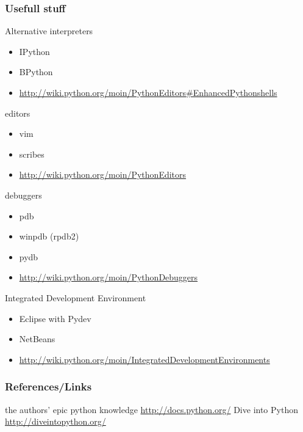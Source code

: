 \documentclass{beamer}
\begin{document}
\begin{frame}[allowframebreaks]
	\frametitle{Usefull stuff}
	
	\begin{block}{Alternative interpreters}
	\begin{itemize}
		\item IPython
		\item BPython
		\item \url{http://wiki.python.org/moin/PythonEditors\#EnhancedPythonshells}
	\end{itemize}
	\end{block}

	\begin{block}{editors}
	\begin{itemize}
		\item vim
		\item scribes
		\item \url{http://wiki.python.org/moin/PythonEditors}
	\end{itemize}
	\end{block}

\framebreak

	\begin{block}{debuggers}
	\begin{itemize}
		\item pdb
		\item winpdb (rpdb2)
		\item pydb
		\item \url{http://wiki.python.org/moin/PythonDebuggers}
	\end{itemize}
	\end{block}
	
	\begin{block}{Integrated Development Environment}
	\begin{itemize}
		\item Eclipse with Pydev
		\item NetBeans
		\item \url{http://wiki.python.org/moin/IntegratedDevelopmentEnvironments}
	\end{itemize}
	\end{block}
\end{frame}

\begin{frame}
	\frametitle{References/Links}
	\begin{thebibliography}{3}
	 the authors' epic python knowledge
	 \url{http://docs.python.org/}
	 Dive into Python \url{http://diveintopython.org/}
	\end{thebibliography}
\end{frame}
\end{document}
